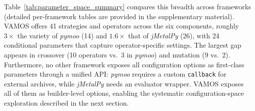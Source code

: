 \documentclass[journal]{IEEEtran}
\newcommand{\VAMOS}{VAMOS}
\begin{document}
Table~\ref{tab:parameter_space_summary} compares this breadth across frameworks (detailed per-framework tables are provided in the supplementary material). \VAMOS{} offers 41 strategies and operators across the six components, roughly $3\times$ the variety of \textit{pymoo} (14) and $1.6\times$ that of \textit{jMetalPy} (26), with 24 conditional parameters that capture operator-specific settings. The largest gap appears in crossover (10 operators vs.\ 3 in \textit{pymoo}) and mutation (9 vs.\ 2). Furthermore, no other framework exposes all configuration options as first-class parameters through a unified API: \textit{pymoo} requires a custom \texttt{callback} for external archives, while \textit{jMetalPy} needs an evaluator wrapper. \VAMOS{} exposes all of them as builder-level options, enabling the systematic configuration-space exploration described in the next section.
\end{document}
